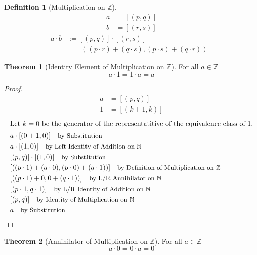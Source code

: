 \documentclass[12pt]{article}
\newcommand{\stext}[1]{\quad\text{\small #1}}
\theoremstyle{definition}
\newtheorem{theorem}{Theorem}
\newtheorem{definition}{Definition}
\begin{document}
\begin{definition}[Multiplication on $\mathbb{Z}$]
    \begin{align*}
        a &= [(p, q)] \\ 
        b &= [(r, s)]
    \end{align*}
    \begin{align*}
        a \cdot b &:= [(p, q)] \cdot [(r, s)] \\
        &= [((p \cdot r) + (q \cdot s), (p \cdot s) + (q \cdot r))]
    \end{align*}
\end{definition}
\begin{theorem}[Identity Element of Multiplication on $\mathbb{Z}$]
    For all $a \in \mathbb{Z}$
    \begin{equation*}
        a \cdot 1 = 1 \cdot a = a
    \end{equation*}
\end{theorem}
\begin{proof}
    \begin{align*}
        a &= [(p, q)] \\
        1 &= [(k + 1, k)]
    \end{align*}
    \begin{align*}
        \intertext{Let $k = 0$ be the generator of the representatitive of the equivalence class of $1$.}
        & a \cdot [(0 + 1, 0)] \stext{by Substitution}\\ 
        & a \cdot [(1, 0)] \stext{by Left Identity of Addition on $\mathbb{N}$}\\ 
        & [(p, q)] \cdot [(1, 0)] \stext{by Substitution}\\
        & [((p \cdot 1) + (q \cdot 0), (p \cdot 0) + (q \cdot 1))] \stext{by Definition of Multiplication on $\mathbb{Z}$}\\ 
        & [((p \cdot 1) + 0, 0 + (q \cdot 1))] \stext{by L/R Annihilator on $\mathbb{N}$}\\ 
        & [(p \cdot 1, q \cdot 1)] \stext{by L/R Identity of Addition on $\mathbb{N}$}\\ 
        & [(p, q)] \stext{by Identity of Multiplication on $\mathbb{N}$}\\
        & a \stext{by Substitution}\\
    \end{align*}
\end{proof}
\begin{theorem}[Annihilator of Multiplication on $\mathbb{Z}$]
    For all $a \in \mathbb{Z}$
    \begin{equation*}
        a \cdot 0 = 0 \cdot a = 0
    \end{equation*}
\end{theorem}
\end{document}
